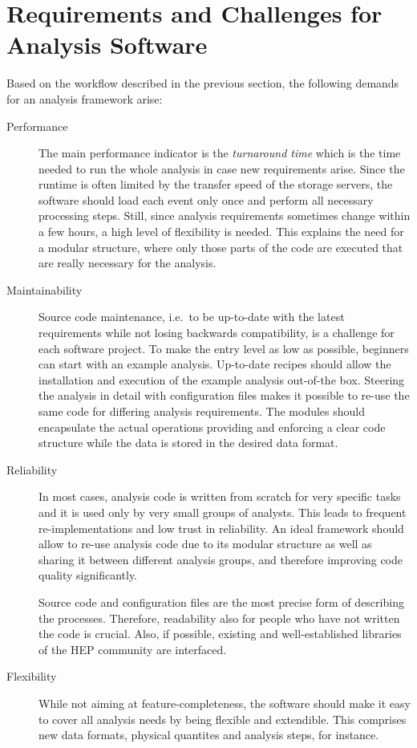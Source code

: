 \documentclass[3p]{elsarticle}
\begin{document}
\section{Requirements and Challenges for Analysis Software}
\label{section_artus_challenges}
Based on the workflow described in the previous section, the following demands for an analysis framework arise:

\begin{description}
\item[Performance]
The main performance indicator is the \emph{turnaround time} which is the time needed to run the whole analysis in case new requirements arise.
Since the runtime is often limited by the transfer speed of the storage servers, the software should load each event only once and perform all necessary processing steps.
Still, since analysis requirements sometimes change within a few hours, a high level of flexibility is needed.
This explains the need for a modular structure, where only those parts of the code are executed that are really necessary for the analysis.

\item[Maintainability]
Source code maintenance, i.e.\ to be up-to-date with the latest requirements while not losing backwards compatibility, is a challenge for each software project.
To make the entry level as low as possible, beginners can start with an example analysis. 
Up-to-date recipes should allow the installation and execution of the example analysis out-of-the box.
Steering the analysis in detail with configuration files makes it possible to re-use the same code for differing analysis requirements.
The modules should encapsulate the actual operations providing and enforcing a clear code structure while the data is stored in the desired data format.

\item[Reliability]
In most cases, analysis code is written from scratch for very specific tasks and it is used only by very small groups of analysts.
This leads to frequent re-imple\-men\-ta\-tions and low trust in reliability.
An ideal framework should allow to re-use analysis code due to its modular structure as well as sharing it between different analysis groups, and therefore improving code quality significantly.

Source code and configuration files are the most precise form of describing the processes.
Therefore, readability also for people who have not written the code is crucial.
Also, if possible, existing and well-established libraries of the HEP community are interfaced.

\item[Flexibility]
While not aiming at feature-completeness, the software should make it easy to cover all analysis needs by being flexible and extendible.
This comprises new data formats, physical quantites and analysis steps, for instance.
\end{description}
\end{document}

